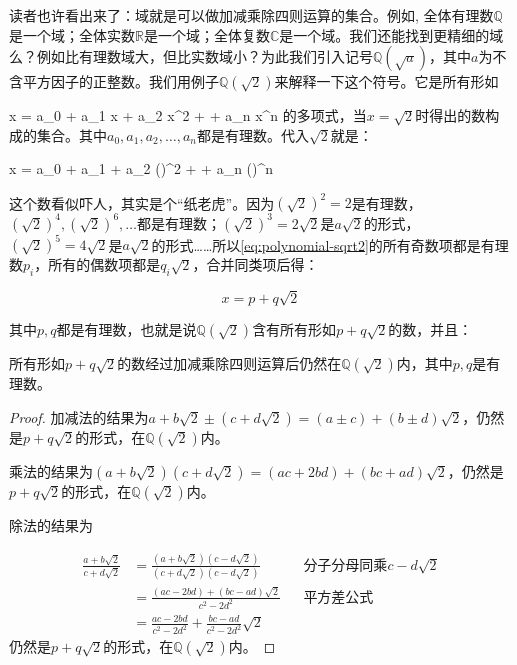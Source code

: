 读者也许看出来了：域就是可以做加减乘除四则运算的集合。例如, 全体有理数$\mathbb{Q}$是一个域；全体实数$\mathbb{R}$是一个域；全体复数$\mathbb{C}$是一个域。我们还能找到更精细的域么？例如比有理数域大，但比实数域小？为此我们引入记号$\mathbb{Q}(\sqrt{a})$，其中$a$为不含平方因子的正整数。我们用例子$\mathbb{Q}(\sqrt{2})$来解释一下这个符号。它是所有形如

\be
x = a_0 + a_1 x + a_2 x^2 + \dotsb + a_n x^n
\ee
的多项式，当$x = \sqrt{2}$时得出的数构成的集合。其中$a_0, a_1, a_2, \dotsc, a_n$都是有理数。代入$\sqrt{2}$就是：

\be
x = a_0 + a_1  + a_2 ()^2 + \dotsb + a_n ()^n
\label{eq:polynomial-sqrt2}
\ee

这个数看似吓人，其实是个“纸老虎”。因为$(\sqrt{2})^2 = 2$是有理数，$(\sqrt{2})^4, (\sqrt{2})^6, \dotsc$都是有理数；$(\sqrt{2})^3 = 2\sqrt{2}$是$a\sqrt{2}$的形式，$(\sqrt{2})^5 = 4\sqrt{2}$是$a\sqrt{2}$的形式……所以\ref{eq:polynomial-sqrt2}的所有奇数项都是有理数$p_i$，所有的偶数项都是$q_i\sqrt{2}$，合并同类项后得：

\[
x = p + q\sqrt{2}
\]

其中$p, q$都是有理数，也就是说$\mathbb{Q}(\sqrt{2})$含有所有形如$p + q\sqrt{2}$的数，并且：

\begin{proposition}
所有形如$p + q\sqrt{2}$的数经过加减乘除四则运算后仍然在$\mathbb{Q}(\sqrt{2})$内，其中$p, q$是有理数。
\end{proposition}

\begin{proof}
加减法的结果为$a + b\sqrt{2} \pm (c + d\sqrt{2}) = (a \pm c) + (b \pm d)\sqrt{2}$，仍然是$p + q\sqrt{2}$的形式，在$\mathbb{Q}(\sqrt{2})$内。

乘法的结果为$(a + b\sqrt{2})(c + d\sqrt{2}) = (ac + 2bd) + (bc + ad)\sqrt{2}$，仍然是$p + q\sqrt{2}$的形式，在$\mathbb{Q}(\sqrt{2})$内。

除法的结果为

\begin{align*}
\frac{a + b\sqrt{2}}{c + d\sqrt{2}} &= \frac{(a + b\sqrt{2})(c - d\sqrt{2})}{(c + d\sqrt{2})(c - d\sqrt{2})} &&\text{分子分母同乘}c - d\sqrt{2} \\
&= \frac{(ac - 2bd) + (bc - ad)\sqrt{2}}{c^2 - 2d^2} &&\text{平方差公式} \\
&= \frac{ac - 2bd}{c^2 - 2d^2} + \frac{bc - ad}{c^2 - 2d^2}\sqrt{2}
\end{align*}
仍然是$p + q\sqrt{2}$的形式，在$\mathbb{Q}(\sqrt{2})$内。
\end{proof}


